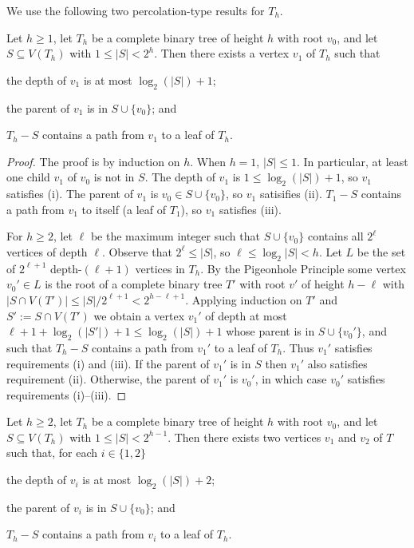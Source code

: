 \documentclass{patmorin}
\renewcommand{\le}{\leqslant}
\renewcommand{\ge}{\geqslant}
\begin{document}
We use the following two percolation-type results for $T_h$. 

\begin{lem}\label{one_path}
  Let $h\ge 1$, let $T_h$ be a complete binary tree of height $h$ with root $v_0$, and let $S\subseteq V(T_h)$ with $1\le |S|< 2^h$. Then there exists a vertex $v_1$ of $T_h$ such that
  \begin{compactenum}[(i)]
    \item the depth of $v_1$ is at most $\log_2(|S|)+1$;
    \item the parent of $v_1$ is in $S\cup\{v_0\}$; and
    \item $T_h-S$ contains a path from $v_1$ to a leaf of $T_h$.
  \end{compactenum}
\end{lem}

\begin{proof}
  The proof is by induction on $h$.  When $h=1$, $|S|\le 1$. In particular, at least one child $v_1$ of $v_0$ is not in $S$.  The depth of $v_1$ is $1\le \log_2(|S|)+1$, so $v_1$ satisfies (i).  The parent of $v_1$ is $v_0\in S\cup\{v_0\}$, so $v_1$ satisifies (ii).  $T_1-S$ contains a path from $v_1$ to itself (a leaf of $T_1$), so $v_1$ satisfies (iii).

  For $h\ge 2$, let $\ell$ be the maximum integer such that $S\cup\{v_0\}$ contains all $2^\ell$ vertices of depth $\ell$.  Observe that $2^\ell \le |S|$, so $\ell \le \log_2 |S| < h$.  Let $L$ be the set of $2^{\ell+1}$ depth-$(\ell+1)$ vertices in $T_h$.  By the Pigeonhole Principle some vertex $v_0'\in L$ is the root of a complete binary tree $T'$ with root $v'$ of height $h-\ell$ with $|S\cap V(T')| \le |S|/2^{\ell+1} < 2^{h-\ell+1}$.  Applying induction on $T'$ and $S':=S\cap V(T')$ we obtain a vertex $v_1'$ of depth at most $\ell+1+\log_2(|S'|)+1 \le \log_2(|S|)+1$ whose parent is in $S\cup\{v_0'\}$, and such that $T_h-S$ contains a path from $v_1'$ to a leaf of $T_h$.  Thus $v_1'$ satisfies requirements (i) and (iii).  If the parent of $v_1'$ is in $S$ then $v_1'$ also satisfies requirement (ii).  Otherwise, the parent of $v_1'$ is $v_0'$, in which case $v_0'$ satisfies requirements (i)--(iii).
\end{proof}

\begin{lem}\label{two_paths}
  Let $h\ge 2$, let $T_h$ be a complete binary tree of height $h$ with root $v_0$, and let $S\subseteq V(T_h)$ with $1\le |S|< 2^{h-1}$. Then there exists two vertices $v_1$ and $v_2$ of $T$ such that, for each $i\in\{1,2\}$ 
  \begin{compactenum}[(i)]
    \item the depth of $v_i$ is at most $\log_2(|S|)+2$;
    \item the parent of $v_i$ is in $S\cup\{v_0\}$; and
    \item $T_h-S$ contains a path from $v_i$ to a leaf of $T_h$.
  \end{compactenum} 
\end{lem}
\end{document}
